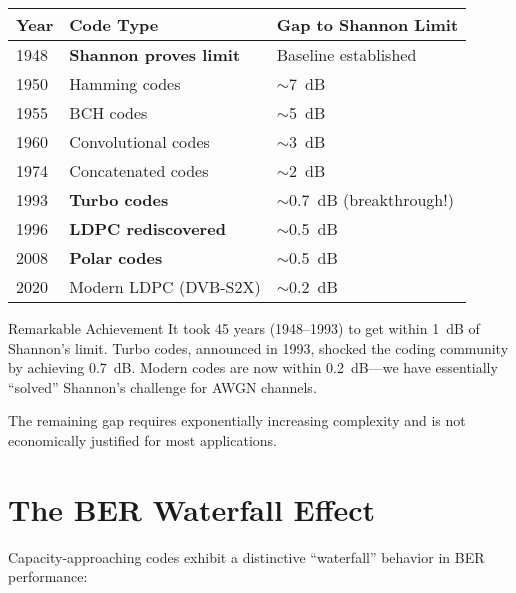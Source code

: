\begin{center}
\begin{tabular}{@{}lll@{}}
\toprule
Year & Code Type & Gap to Shannon Limit \\
\midrule
1948 & \textbf{Shannon proves limit} & Baseline established \\
1950 & Hamming codes & $\sim$7~dB \\
1955 & BCH codes & $\sim$5~dB \\
1960 & Convolutional codes & $\sim$3~dB \\
1974 & Concatenated codes & $\sim$2~dB \\
1993 & \textbf{Turbo codes} & $\sim$0.7~dB (breakthrough!) \\
1996 & \textbf{LDPC rediscovered} & $\sim$0.5~dB \\
2008 & \textbf{Polar codes} & $\sim$0.5~dB \\
2020 & Modern LDPC (DVB-S2X) & $\sim$0.2~dB \\
\bottomrule
\end{tabular}
\end{center}

\begin{calloutbox}{Remarkable Achievement}
It took 45 years (1948--1993) to get within 1~dB of Shannon's limit. Turbo codes, announced in 1993, shocked the coding community by achieving 0.7~dB. Modern codes are now within 0.2~dB---we have essentially ``solved'' Shannon's challenge for AWGN channels.

The remaining gap requires exponentially increasing complexity and is not economically justified for most applications.
\end{calloutbox}

\section{The BER Waterfall Effect}

Capacity-approaching codes exhibit a distinctive ``waterfall'' behavior in BER performance:

